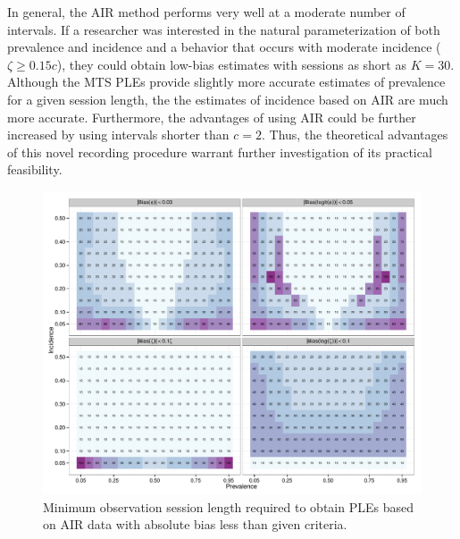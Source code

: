 \documentclass[man, noextraspace, floatsintext]{apa6}\usepackage[]{graphicx}\usepackage[]{color}
\makeatletter
\def\maxwidth{ %
  \ifdim\Gin@nat@width>\linewidth
    \linewidth
  \else
    \Gin@nat@width
  \fi
}
\newenvironment{knitrout}{}{} %
\makeatother
\begin{document}
In general, the AIR method performs very well at a moderate number of intervals. If a researcher was interested in the natural parameterization of both prevalence and incidence and a behavior that occurs with moderate incidence ($\zeta \geq 0.15c$), they could obtain low-bias estimates with sessions as short as $K = 30$. Although the MTS PLEs provide slightly more accurate estimates of prevalence for a given session length, the the estimates of incidence based on AIR are much more accurate. Furthermore, the advantages of using AIR could be further increased by using intervals shorter than $c = 2$. Thus, the theoretical advantages of this novel recording procedure warrant further investigation of its practical feasibility.

\begin{knitrout}
\color{fgcolor}\begin{figure}[tb]


{\centering \includegraphics[width=\maxwidth]{fig/AIR_sample_size} 

}

\caption[Minimum observation session length required to obtain PLEs based on AIR data with absolute bias less than given criteria]{Minimum observation session length required to obtain PLEs based on AIR data with absolute bias less than given criteria.\label{fig:AIR_sample_size}}
\end{figure}


\end{knitrout}
\end{document}
